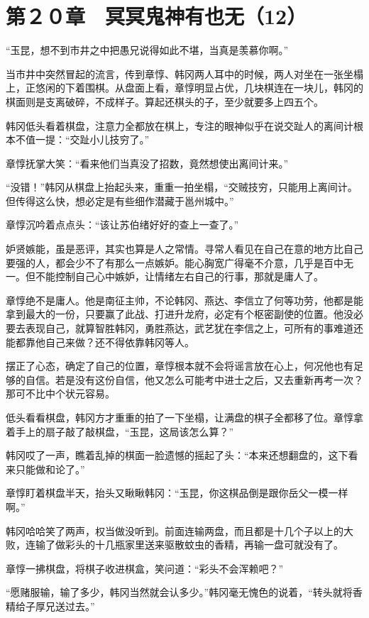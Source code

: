 \section{第２０章　冥冥鬼神有也无（12）}

“玉昆，想不到市井之中把愚兄说得如此不堪，当真是羡慕你啊。”

当市井中突然冒起的流言，传到章惇、韩冈两人耳中的时候，两人对坐在一张坐榻上，正悠闲的下着围棋。从盘面上看，章惇明显占优，几块棋连在一块儿，韩冈的棋面则是支离破碎，不成样子。算起还棋头的子，至少就要多上四五个。

韩冈低头看着棋盘，注意力全都放在棋上，专注的眼神似乎在说交趾人的离间计根本不值一提：“交趾小儿技穷了。”

章惇抚掌大笑：“看来他们当真没了招数，竟然想使出离间计来。”

“没错！”韩冈从棋盘上抬起头来，重重一拍坐榻，“交贼技穷，只能用上离间计。但传得这么快，想必定是有些细作潜藏于邕州城中。”

章惇沉吟着点点头：“该让苏伯绪好好的查上一查了。”

妒贤嫉能，虽是恶评，其实也算是人之常情。寻常人看见在自己在意的地方比自己要强的人，都会少不了有那么一点嫉妒。能心胸宽广得毫不介意，几乎是百中无一。但不能控制自己心中嫉妒，让情绪左右自己的行事，那就是庸人了。

章惇绝不是庸人。他是南征主帅，不论韩冈、燕达、李信立了何等功劳，他都是能拿到最大的一份，只要赢了此战、打进升龙府，必定有个枢密副使的位置。他没必要去表现自己，就算智胜韩冈，勇胜燕达，武艺犹在李信之上，可所有的事难道还能都靠他自己来做？还不得依靠韩冈等人。

摆正了心态，确定了自己的位置，章惇根本就不会将谣言放在心上，何况他也有足够的自信。若是没有这份自信，他又怎么可能考中进士之后，又去重新再考一次？那可不比中个状元容易。

低头看看棋盘，韩冈方才重重的拍了一下坐榻，让满盘的棋子全都移了位。章惇拿着手上的扇子敲了敲棋盘，“玉昆，这局该怎么算？”

韩冈哎了一声，瞧着乱掉的棋面一脸遗憾的摇起了头：“本来还想翻盘的，这下看来只能做和论了。”

章惇盯着棋盘半天，抬头又瞅瞅韩冈：“玉昆，你这棋品倒是跟你岳父一模一样啊。”

韩冈哈哈笑了两声，权当做没听到。前面连输两盘，而且都是十几个子以上的大败，连输了做彩头的十几瓶家里送来驱散蚊虫的香精，再输一盘可就没有了。

章惇一拂棋盘，将棋子收进棋盒，笑问道：“彩头不会浑赖吧？”

“愿赌服输，输了多少，韩冈当然就会认多少。”韩冈毫无愧色的说着，“转头就将香精给子厚兄送过去。”

